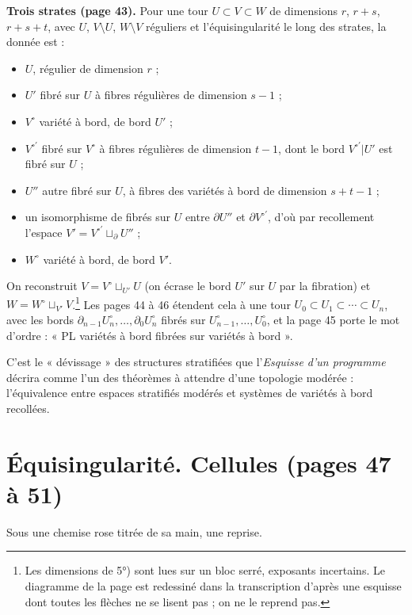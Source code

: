 \documentclass[11pt,a4paper]{article}
\begin{document}
\textbf{Trois strates (page 43).} Pour une tour $U \subset V \subset W$ de
dimensions $r$, $r+s$, $r+s+t$, avec $U$, $V \setminus U$, $W \setminus V$
réguliers et l'équisingularité le long des strates, la donnée est :

\begin{itemize}
\item[1°)] $U$, régulier de dimension $r$ ;
\item[2°)] $U'$ fibré sur $U$ à fibres régulières de dimension $s-1$ ;
\item[3°)] $V^{\circ}$ variété à bord, de bord $U'$ ;
\item[4°)] $V^{\circ\prime}$ fibré sur $V^{\circ}$ à fibres régulières de
  dimension $t-1$, dont le bord $V^{\circ\prime}|U'$ est fibré sur $U$ ;
\item[5°)] $U''$ autre fibré sur $U$, à fibres des variétés à bord de dimension
  $s+t-1$ ;
\item[6°)] un isomorphisme de fibrés sur $U$ entre $\partial U''$ et $\partial
  V^{\circ\prime}$, d'où par recollement l'espace $V' = V^{\circ\prime}
  \sqcup_\partial U''$ ;
\item[7°)] $W^{\circ}$ variété à bord, de bord $V'$.
\end{itemize}

On reconstruit $V = V^{\circ} \sqcup_{U'} U$ (on écrase le bord $U'$ sur $U$
par la fibration) et $W = W^{\circ} \sqcup_{V'} V$.\footnote{Les dimensions de
5°) sont lues sur un bloc serré, exposants incertains. Le diagramme de la page
est redessiné dans la transcription d'après une esquisse dont toutes les
flèches ne se lisent pas ; on ne le reprend pas.} Les pages 44 à 46 étendent
cela à une tour $U_0 \subset U_1 \subset \cdots \subset U_n$, avec les bords
$\partial_{n-1} U_n^{\circ}, \dots, \partial_0 U_n^{\circ}$ fibrés sur
$U_{n-1}^{\circ}, \dots, U_0^{\circ}$, et la page 45 porte le mot
d'ordre : « PL variétés à bord fibrées sur variétés à bord ».

C'est le « dévissage » des structures stratifiées que l'\emph{Esquisse d'un
programme} décrira comme l'un des théorèmes à attendre d'une topologie
modérée : l'équivalence entre espaces stratifiés modérés et systèmes de
variétés à bord recollées.

\section*{Équisingularité. Cellules (pages 47 à 51)}

Sous une chemise rose titrée de sa main, une reprise.
\end{document}
